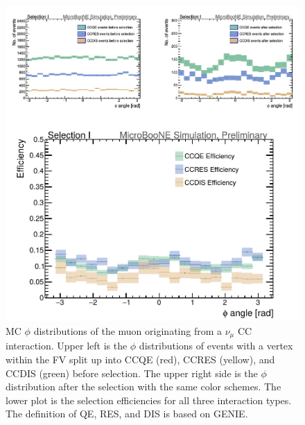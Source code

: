 \begin{figure}[htp!]
\includegraphics[width=\textwidth]{figs/truth_stackedmuphi.png}
\caption{MC $\phi$ distributions of the muon originating from a $\nu_{\mu}$ CC interaction. Upper left is the $\phi$ distributions of events with a vertex within the FV split up into CCQE (red), CCRES (yellow), and CCDIS (green) before selection. The upper right side is the $\phi$ distribution after the selection with the same color schemes. The lower plot is the selection efficiencies for all three interaction types. The definition of QE, RES, and DIS is based on GENIE.}
\label{fig:stacked2}
\end{figure}
